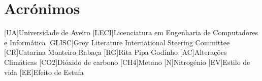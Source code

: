 \documentclass{report}
\begin{document}
\chapter*{Acrónimos}
\begin{acronym}
	[UA]{Universidade de Aveiro}
	[LECI]{Licenciatura em Engenharia de Computadores e Informática}
	[GLISC]{Grey Literature International Steering Committee}
	[CR]{Catarina Monteiro Rabaça}
	[RG]{Rita Pipa Godinho}
	[AC]{Alterações Climáticas}
	[CO2]{Dióxido de carbono}
	[CH4]{Metano}
	{Nitrogénio}
	[EV]{Estilo de vida}
	[EE]{Efeito de Estufa}
	
\end{acronym}

\printbibliography
\end{document}
